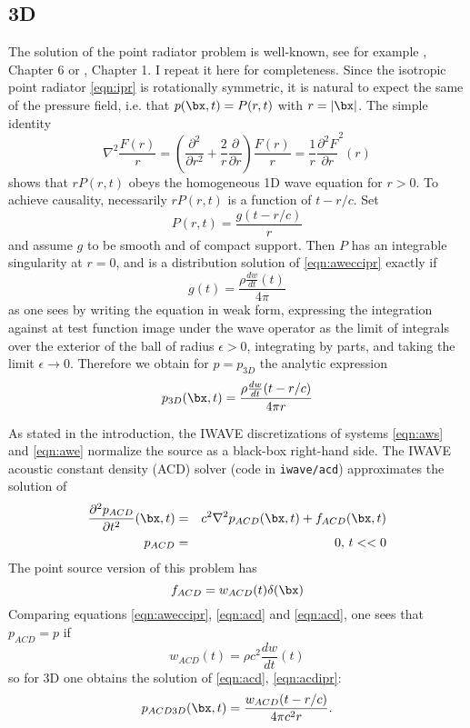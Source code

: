 \subsection{3D}
The solution of the point radiator problem is well-known, see for example \cite{CouHil:62}, Chapter 6 or \cite{GuiSte:79}, Chapter 1. I repeat it here for completeness. Since the isotropic point radiator \ref{eqn:ipr} is rotationally symmetric, it is natural to expect the same of the pressure field, i.e. that $p(\bx,t) = P(r,t)$ with $r=|\bx|$. The simple identity
\begin{equation}
\label{eqn:calc}
\nabla^2 \frac{F(r)}{r} = \left(\frac{\partial^2}{\partial r^2} + \frac{2}{r}\frac{\partial}{\partial r}\right) \frac{F(r)}{r} = \frac{1}{r}\frac{\partial^2 F}{\partial r}^2(r)
\end{equation}
shows that $rP(r,t)$ obeys the homogeneous 1D wave equation for $r>0$. To achieve causality, necessarily $rP(r,t)$ is a function of $t-r/c$. Set
\[
P(r,t) = \frac{g(t-r/c)}{r}
\]
and assume $g$ to be smooth and of compact support. Then $P$ has an integrable singularity at $r=0$, and is a distribution solution of \ref{eqn:aweccipr} exactly if
\[
g(t) = \frac{\rho\frac{dw}{dt}(t)}{4\pi}
\]
as one sees by writing the equation in weak form, expressing the integration against at test function image under the wave operator as the limit of integrals over the exterior of the ball of radius $\epsilon >0$, integrating by parts, and taking the limit $\epsilon \rightarrow 0$. Therefore we obtain for $p=p_{3D}$ the analytic expression
\begin{equation}
\label{eqn:awsol3D}
p_{3D}(\bx,t) = \frac{\rho\frac{dw}{dt}(t-r/c)}{4\pi r}
\end{equation}

As stated in the introduction, the IWAVE discretizations of systems \ref{eqn:aws} and \ref{eqn:awe} normalize the source as a black-box right-hand side. The IWAVE acoustic constant density (ACD) solver (code in {\tt iwave/acd}) approximates the solution of 
\begin{eqnarray}
\label{eqn:acd}
\frac{\partial^2 p_{ACD}}{\partial t^2}(\bx,t) & = &c^2\nabla^2 p_{ACD}(\bx,t) + f_{ACD}(\bx,t)\nonumber\\
p_{ACD} & = & 0, \,t<<0 
\end{eqnarray}
The point source version of this problem has
\begin{equation}
\label{eqn:acdipr}
f_{ACD} = w_{ACD}(t)\delta(\bx)
\end{equation}
Comparing equations \ref{eqn:aweccipr}, \ref{eqn:acd} and \ref{eqn:acd}, one sees that $p_{ACD} = p$ if 
\[
w_{ACD}(t) = \rho c^2 \frac{dw}{dt}(t) 
\]
so for 3D one obtains the solution of \ref{eqn:acd}, \ref{eqn:acdipr}:
\begin{equation}
\label{eqn:acdsol3D}
p_{ACD3D}(\bx,t) = \frac{ w_{ACD}(t-r/c)}{4\pi c^2 r}.
\end{equation}

